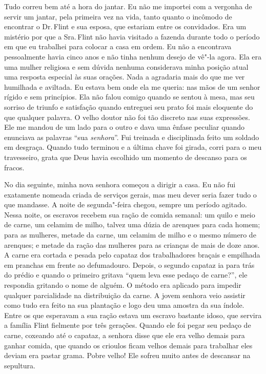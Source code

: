 Tudo correu bem até a hora do jantar.
Eu não me importei com a vergonha de servir um jantar, pela primeira vez
na vida, tanto quanto o incômodo de encontrar o Dr.\,Flint e sua esposa,
que estariam entre os convidados. Era um mistério por que a Sra.\,Flint
não havia visitado a fazenda durante todo o período em que eu trabalhei
para colocar a casa em ordem. Eu não a encontrava pessoalmente havia
cinco anos e não tinha nenhum desejo de vê"-la agora. Ela era uma mulher
religiosa e sem dúvida nenhuma considerava minha posição atual uma
resposta especial às suas orações. Nada a agradaria mais do que me ver
humilhada e aviltada. Eu estava bem onde ela me queria: nas mãos de um
senhor rígido e sem princípios. Ela não falou comigo quando se sentou à
mesa, mas seu sorriso de triunfo e satisfação quando entreguei seu prato
foi mais eloquente do que qualquer palavra. O velho doutor não foi tão
discreto nas suas expressões. Ele me mandou de um lado para o outro e
dava uma ênfase peculiar quando enunciava as palavras ``sua
\emph{senhora}''. Fui treinada e disciplinada feito um soldado em
desgraça. Quando tudo terminou e a última chave foi girada, corri para o
meu travesseiro, grata que Deus havia escolhido um momento de descanso
para os fracos.

No dia seguinte, minha nova senhora
começou a dirigir a casa. Eu não fui exatamente nomeada criada de
serviços gerais, mas meu dever seria fazer tudo o que mandasse. A noite
de segunda"-feira chegou, sempre um período agitado. Nessa noite, os
escravos recebem sua ração de comida semanal: um quilo e meio de carne,
um celamim de milho, talvez uma dúzia de arenques para cada homem; para
as mulheres, metade da carne, um celamim de milho e o mesmo número de
arenques; e metade da ração das mulheres para as crianças de mais de
doze anos. A carne era cortada e pesada pelo capataz dos trabalhadores
braçais e empilhada em pranchas em frente ao defumadouro. Depois, o
segundo capataz ia para trás do prédio e quando o primeiro gritava
``quem leva esse pedaço de carne?'', ele respondia gritando o nome de
alguém. O método era aplicado para impedir qualquer parcialidade na
distribuição da carne. A jovem senhora veio assistir como tudo era feito
na sua plantação e logo deu uma amostra da sua índole. Entre os que
esperavam a sua ração estava um escravo bastante idoso, que servira a
família Flint fielmente por três gerações. Quando ele foi pegar seu
pedaço de carne, coxeando até o capataz, a senhora disse que ele era
velho demais para ganhar comida, que quando os crioulos ficam velhos
demais para trabalhar eles deviam era pastar grama. Pobre velho! Ele
sofreu muito antes de descansar na sepultura.

